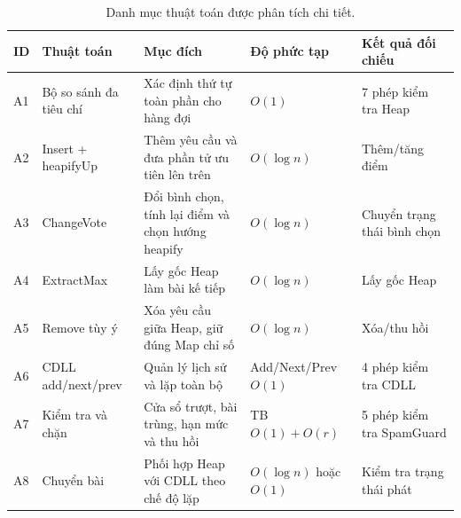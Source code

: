 \documentclass[12pt,a4paper,twoside,openright]{report}
\begin{document}
\begin{table}[H]\centering\footnotesize
\begin{tabularx}{\textwidth}{@{}p{1cm}p{4.15cm}p{4.1cm}Xp{2.2cm}@{}}
\toprule
\textbf{ID} & \textbf{Thuật toán} & \textbf{Mục đích} & \textbf{Độ phức tạp} &
\textbf{Kết quả đối chiếu}\\
\midrule
A1 & Bộ so sánh đa tiêu chí & Xác định thứ tự toàn phần cho hàng đợi & $O(1)$ & 7 phép kiểm tra Heap\\
A2 & Insert + heapifyUp & Thêm yêu cầu và đưa phần tử ưu tiên lên trên & $O(\log n)$ & Thêm/tăng điểm\\
A3 & ChangeVote & Đổi bình chọn, tính lại điểm và chọn hướng heapify & $O(\log n)$ & Chuyển trạng thái bình chọn\\
A4 & ExtractMax & Lấy gốc Heap làm bài kế tiếp & $O(\log n)$ & Lấy gốc Heap\\
A5 & Remove tùy ý & Xóa yêu cầu giữa Heap, giữ đúng Map chỉ số & $O(\log n)$ & Xóa/thu hồi\\
A6 & CDLL add/next/prev & Quản lý lịch sử và lặp toàn bộ & Add/Next/Prev $O(1)$ & 4 phép kiểm tra CDLL\\
A7 & Kiểm tra và chặn & Cửa sổ trượt, bài trùng, hạn mức và thu hồi & TB $O(1)+O(r)$ & 5 phép kiểm tra SpamGuard\\
A8 & Chuyển bài & Phối hợp Heap với CDLL theo chế độ lặp & $O(\log n)$ hoặc $O(1)$ & Kiểm tra trạng thái phát\\
\bottomrule
\end{tabularx}
\caption{Danh mục thuật toán được phân tích chi tiết.}
\label{tab:algorithm-catalog}
\end{table}

\end{document}
